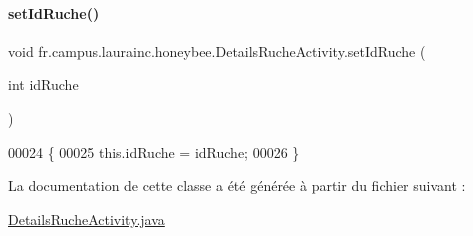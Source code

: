 \paragraph{\texorpdfstring{set\+Id\+Ruche()}{setIdRuche()}}
{\footnotesize\ttfamily void fr.\+campus.\+laurainc.\+honeybee.\+Details\+Ruche\+Activity.\+set\+Id\+Ruche (\begin{DoxyParamCaption}\item[{int}]{id\+Ruche }\end{DoxyParamCaption})}


\begin{DoxyCode}
00024                                         \{
00025         this.idRuche = idRuche;
00026     \}
\end{DoxyCode}


La documentation de cette classe a été générée à partir du fichier suivant \+:\begin{DoxyCompactItemize}
\item 
\hyperlink{_details_ruche_activity_8java}{Details\+Ruche\+Activity.\+java}\end{DoxyCompactItemize}
